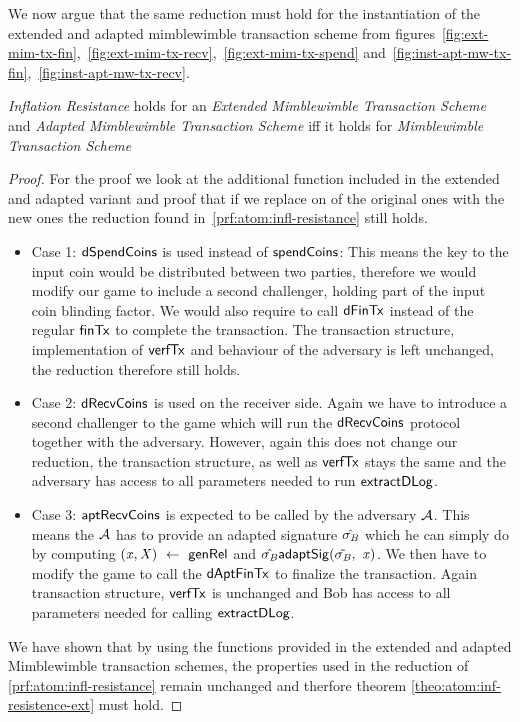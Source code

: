 We now argue that the same reduction must hold for the instantiation of the extended and adapted mimblewimble transaction scheme from figures~\ref{fig:ext-mim-tx-fin},~\ref{fig:ext-mim-tx-recv},~\ref{fig:ext-mim-tx-spend} and~\ref{fig:inst-apt-mw-tx-fin},~\ref{fig:inst-apt-mw-tx-recv}.

\begin{theorem} \label{theo:atom:inf-resistence-ext}
    \emph{Inflation Resistance} holds for an \emph{Extended Mimblewimble Transaction Scheme} and \emph{Adapted Mimblewimble Transaction Scheme} iff it holds for \emph{Mimblewimble Transaction Scheme}
\end{theorem}

\begin{proof}
    For the proof we look at the additional function included in the extended and adapted variant and proof that if we replace on of the original ones with the new ones the reduction found in~\ref{prf:atom:infl-resistance} still holds.

    \begin{itemize}
        \item Case 1: $\mathsf{dSpendCoins}$ is used instead of $\mathsf{spendCoins}$: This means the key to the input coin would be distributed between two parties, therefore we would modify our game to include a second challenger, holding part of the input coin blinding factor.
        We would also require to call $\mathsf{dFinTx}$ instead of the regular $\mathsf{finTx}$ to complete the transaction.
        The transaction structure, implementation of $\mathsf{verfTx}$ and behaviour of the adversary is left unchanged, the reduction therefore still holds.
        \item Case 2: $\mathsf{dRecvCoins}$ is used on the receiver side.
        Again we have to introduce a second challenger to the game which will run the $\mathsf{dRecvCoins}$ protocol together with the adversary.
        However, again this does not change our reduction, the transaction structure, as well as $\mathsf{verfTx}$ stays the same and the adversary has access to all parameters needed to run $\mathsf{extractDLog}$.
        \item Case 3: $\mathsf{aptRecvCoins}$ is expected to be called by the adversary $\mathcal{A}$.
        This means the $\mathcal{A}$ has to provide an adapted signature $\hat{\sigma_{\mathit{B}}}$ which he can simply do by computing $(\mathit{x}, \mathit{X}) ~\leftarrow~ \mathsf{genRel}$ and $\hat{\sigma_{\mathit{B}}} \mathsf{adaptSig}(\tilde{\sigma_{\mathit{B}}} ,~ \mathit{x})$.
        We then have to modify the game to call the $\mathsf{dAptFinTx}$ to finalize the transaction.
        Again transaction structure, $\mathsf{verfTx}$ is unchanged and Bob has access to all parameters needed for calling $\mathsf{extractDLog}$.
    \end{itemize}

    We have shown that by using the functions provided in the extended and adapted Mimblewimble transaction schemes, the properties used in the reduction of \ref{prf:atom:infl-resistance} remain unchanged and therfore theorem \ref{theo:atom:inf-resistence-ext} must hold.
\end{proof}

